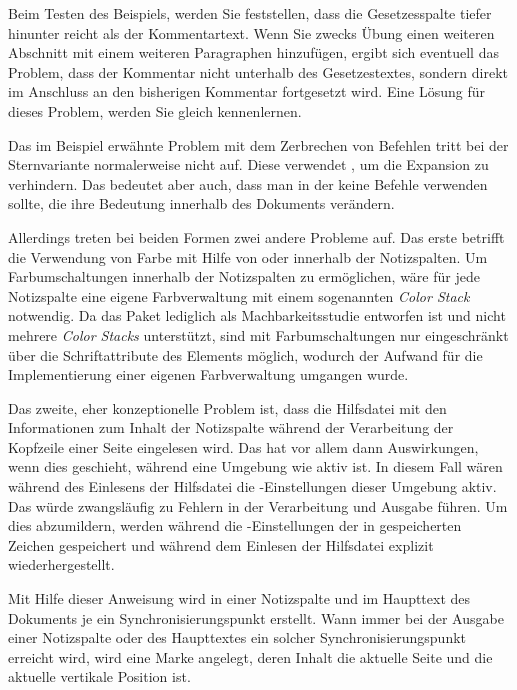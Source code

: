 Beim Testen des Beispiels, werden Sie feststellen, dass die Gesetzes\-spalte
tiefer hinunter reicht als der Kommentartext. Wenn Sie
zwecks Übung einen weiteren Abschnitt mit einem weiteren Paragraphen
hinzufügen, ergibt sich eventuell das Problem, dass der Kommentar nicht
unterhalb des Gesetzestextes, sondern direkt im Anschluss an den bisherigen
Kommentar fortgesetzt wird. Eine Lösung für dieses Problem, werden Sie gleich
kennenlernen.

Das im Beispiel erwähnte
Problem mit dem Zerbrechen von Befehlen tritt bei der
Sternvariante normalerweise nicht auf. Diese
verwendet , um die Expansion zu verhindern. Das bedeutet
aber auch, dass man in der  keine Befehle verwenden sollte, die
ihre Bedeutung innerhalb des Dokuments verändern.

Allerdings treten bei beiden Formen zwei andere Probleme
auf. Das erste betrifft die Verwendung von Farbe mit Hilfe von
 oder 
innerhalb der Notizspalten. Um Farbumschaltungen innerhalb der Notizspalten zu
ermöglichen, wäre für jede Notizspalte eine eigene Farbverwaltung mit einem
sogenannten \emph{Color Stack} notwendig. Da das Paket lediglich als
Machbarkeitsstudie entworfen ist und \XeTeX{} nicht mehrere \emph{Color
  Stacks} unterstützt, sind mit \XeTeX{} Farbumschaltungen nur eingeschränkt
über die Schriftattribute des Elements  möglich, wodurch der Aufwand für die Implementierung einer
eigenen Farbverwaltung umgangen wurde.

Das zweite, eher konzeptionelle Problem ist, dass die
Hilfsdatei mit den Informationen zum Inhalt der Notizspalte während der
Verarbeitung der Kopfzeile einer Seite eingelesen wird. Das hat vor allem dann
Auswirkungen, wenn dies geschieht, während eine Umgebung wie
 aktiv ist. In diesem Fall wären während des Einlesens
der Hilfsdatei die -Einstellungen dieser Umgebung aktiv. Das
würde zwangsläufig zu Fehlern in der Verarbeitung und Ausgabe führen. Um dies
abzumildern, werden während  die
-Einstellungen der in 
gespeicherten Zeichen gespeichert und während dem Einlesen der Hilfsdatei
explizit wiederhergestellt.%
\EndIndexGroup


\begin{Declaration}
\end{Declaration}
Mit Hilfe dieser Anweisung wird in einer Notizspalte und im Haupttext des
Dokuments je ein
Synchronisierungspunkt
erstellt. Wann immer bei der Ausgabe einer Notizspalte oder des Haupttextes
ein solcher Synchronisierungspunkt erreicht wird, wird eine Marke angelegt,
deren Inhalt die aktuelle Seite und die aktuelle vertikale Position ist.

